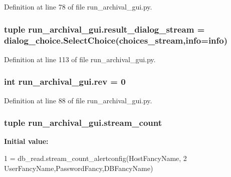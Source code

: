 Definition at line 78 of file run\-\_\-archival\-\_\-gui.\-py.

\hypertarget{namespacerun__archival__gui_ab6fdfba3d0c721228ed99b51992b59af}{
\subsubsection[{result\-\_\-dialog\-\_\-stream}]{\setlength{\rightskip}{0pt plus 5cm}tuple run\-\_\-archival\-\_\-gui.\-result\-\_\-dialog\-\_\-stream = dialog\-\_\-choice.\-Select\-Choice({\bf choices\-\_\-stream},{\bf info}={\bf info})}}\label{namespacerun__archival__gui_ab6fdfba3d0c721228ed99b51992b59af}


Definition at line 113 of file run\-\_\-archival\-\_\-gui.\-py.

\hypertarget{namespacerun__archival__gui_a7a0000484d87d296a359fc208834f58b}{
\subsubsection[{rev}]{\setlength{\rightskip}{0pt plus 5cm}int run\-\_\-archival\-\_\-gui.\-rev = 0}}\label{namespacerun__archival__gui_a7a0000484d87d296a359fc208834f58b}


Definition at line 88 of file run\-\_\-archival\-\_\-gui.\-py.

\hypertarget{namespacerun__archival__gui_a0b79d0287b0d0657f1aa1af18063c1e1}{
\subsubsection[{stream\-\_\-count}]{\setlength{\rightskip}{0pt plus 5cm}tuple run\-\_\-archival\-\_\-gui.\-stream\-\_\-count}}\label{namespacerun__archival__gui_a0b79d0287b0d0657f1aa1af18063c1e1}
{\bfseries Initial value\-:}
\begin{DoxyCode}
1 = db\_read.stream\_count\_alertconfig(HostFancyName,
2                           UserFancyName,PasswordFancy,DBFancyName)
\end{DoxyCode}



